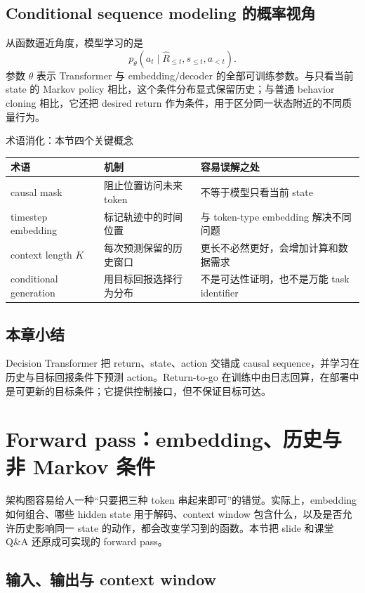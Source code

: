 \documentclass[a4paper]{article}
\begin{document}
\subsection{Conditional sequence modeling 的概率视角}

从函数逼近角度，模型学习的是
\[
p_{\theta}(a_t\mid \widehat{R}_{\le t},s_{\le t},a_{<t}).
\]
参数 $\theta$ 表示 Transformer 与 embedding/decoder 的全部可训练参数。与只看当前 state 的 Markov policy 相比，这个条件分布显式保留历史；与普通 behavior cloning 相比，它还把 desired return 作为条件，用于区分同一状态附近的不同质量行为。

\begin{knowledgebox}{术语消化：本节四个关键概念}
\begin{tabularx}{\textwidth}{L{3.0cm} X X}
\toprule
术语 & 机制 & 容易误解之处 \\
\midrule
causal mask & 阻止位置访问未来 token & 不等于模型只看当前 state \\
timestep embedding & 标记轨迹中的时间位置 & 与 token-type embedding 解决不同问题 \\
context length $K$ & 每次预测保留的历史窗口 & 更长不必然更好，会增加计算和数据需求 \\
conditional generation & 用目标回报选择行为分布 & 不是可达性证明，也不是万能 task identifier \\
\bottomrule
\end{tabularx}
\end{knowledgebox}

\subsection{本章小结}

Decision Transformer 把 return、state、action 交错成 causal sequence，并学习在历史与目标回报条件下预测 action。Return-to-go 在训练中由日志回算，在部署中是可更新的目标条件；它提供控制接口，但不保证目标可达。

\section{Forward pass：embedding、历史与非 Markov 条件}

架构图容易给人一种“只要把三种 token 串起来即可”的错觉。实际上，embedding 如何组合、哪些 hidden state 用于解码、context window 包含什么，以及是否允许历史影响同一 state 的动作，都会改变学习到的函数。本节把 slide 和课堂 Q\&A 还原成可实现的 forward pass。

\subsection{输入、输出与 context window}
\end{document}
